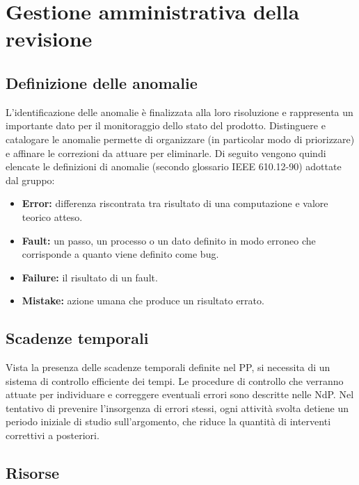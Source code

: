 \documentclass[openany,12pt,a4paper]{report}
\begin{document}

\chapter{Gestione amministrativa della revisione}

\section{Definizione delle anomalie}

L’identificazione delle anomalie è finalizzata alla loro risoluzione e rappresenta un importante dato per il monitoraggio dello stato del prodotto. Distinguere e catalogare le anomalie permette di organizzare (in particolar modo di priorizzare) e affinare le correzioni da attuare per eliminarle. Di seguito
vengono quindi elencate le definizioni di anomalie (secondo glossario IEEE 610.12-90) adottate dal gruppo:

\begin{itemize}
    \item \textbf{Error:} differenza riscontrata tra risultato di una computazione e valore teorico atteso.
    \item \textbf{Fault:} un passo, un processo o un dato definito in modo erroneo che corrisponde a quanto viene definito come bug.
    \item \textbf{Failure:} il risultato di un fault.
    \item \textbf{Mistake:} azione umana che produce un risultato errato.
\end{itemize}

\section{Scadenze temporali}

Vista la presenza delle scadenze temporali definite nel PP, si necessita di un sistema di controllo efficiente dei tempi. Le procedure di controllo che verranno attuate per individuare e correggere eventuali errori sono descritte
nelle NdP. Nel tentativo di prevenire l'insorgenza di errori stessi, ogni attività svolta detiene un periodo iniziale di
studio sull'argomento, che riduce la quantità di interventi correttivi a posteriori.

\section{Risorse}
\end{document}
